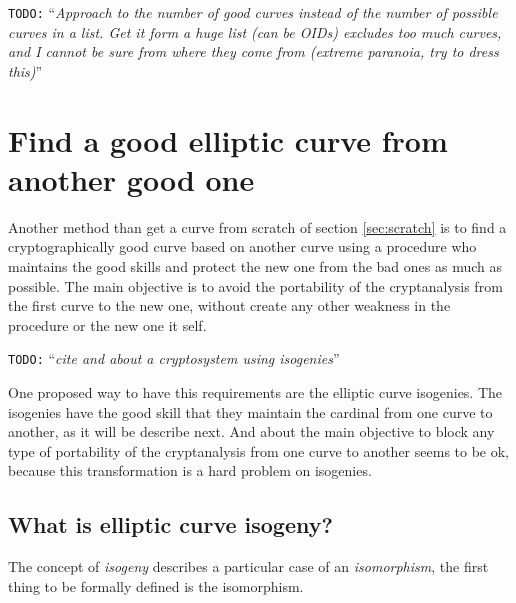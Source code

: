 \documentclass[10pt,a4paper,twoside]{llncs}
\newcommand{\todo}[1]{\texttt{\color{red}TODO:} ``\emph{#1}''}
\begin{document}
\todo{Approach to the number of good curves instead of the number of possible curves in a list. Get it form a huge list (can be OIDs) excludes too much curves, and I cannot be sure from where they come from (extreme paranoia, try to dress this)}
\cite{DAS_guide}%

\section{Find a good elliptic curve from another good one \label{sec:from_another}}

Another method than get a curve from scratch of section \ref{sec:scratch} is to find a cryptographically good curve based on another curve using a procedure who maintains the good skills and protect the new one from the bad ones as much as possible. The main objective is to avoid the portability of the cryptanalysis from the first curve to the new one, without create any other weakness in the procedure or the new one it self.

\todo{cite \cite{Rostovtsev06public} and \cite{isoTFC} about a cryptosystem using isogenies}

One proposed way to have this requirements are the elliptic curve isogenies. The isogenies have the good skill that they maintain the cardinal from one curve to another, as it will be describe next. And about the main objective to block any type of portability of the cryptanalysis from one curve to another seems to be ok, because this transformation is a hard problem on isogenies.

\subsection{What is elliptic curve isogeny? \label{sec:isog}}

The concept of \emph{isogeny} describes a particular case of an \emph{isomorphism}, the first thing to be formally defined is the isomorphism.
\end{document}
